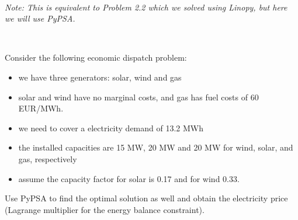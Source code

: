 \documentclass[10pt]{article}
\newenvironment{problem}[2][Problem]{\begin{trivlist}
\item[\hskip \labelsep {\bfseries #1}\hskip \labelsep {\bfseries #2.}]}{\end{trivlist}}
\begin{document}
\

\begin{problem}{6.3}

\textit{Note: This is equivalent to Problem 2.2 which we solved using Linopy, but here we will use PyPSA.}

\

Consider the following economic dispatch problem:

\begin{itemize}
\item[-] we have three generators: solar, wind and gas

\item[-] solar and wind have no marginal costs, and gas has fuel costs of 60 EUR/MWh.

\item[-] we need to cover a electricity demand of 13.2 MWh

\item[-] the installed capacities are 15 MW, 20 MW and 20 MW for wind, solar, and gas, respectively

\item[-] assume the capacity factor for solar is 0.17 and for wind 0.33.
\end{itemize}

Use PyPSA to find the optimal solution as well and obtain the electricity price (Lagrange multiplier for the energy balance constraint).
\end{problem}

\
\end{document}
